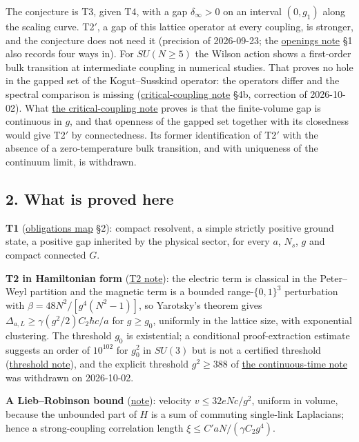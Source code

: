 \documentclass[11pt,a4paper]{article}
\begin{document}
The conjecture is T3, given T4, with a gap \(\delta_\infty>0\) on an
interval \((0,g_1)\) along the scaling curve. T2\('\), a gap of this
lattice operator at every coupling, is stronger, and the conjecture does
not need it (precision of 2026-09-23; the
\href{mass-gap-openings.md}{openings note} §1 also records four ways
in). For \(SU(N\ge5)\) the Wilson action shows a first-order bulk
transition at intermediate coupling in numerical studies. That proves no
hole in the gapped set of the Kogut--Susskind operator: the operators
differ and the spectral comparison is missing
(\href{mass-gap-obligations-lattice.md}{critical-coupling note} §4b,
correction of 2026-10-02). What
\href{mass-gap-obligations-lattice.md}{the critical-coupling note}
proves is that the finite-volume gap is continuous in \(g\), and that
openness of the gapped set together with its closedness would give
T2\('\) by connectedness. Its former identification of T2\('\) with the
absence of a zero-temperature bulk transition, and with uniqueness of
the continuum limit, is withdrawn.

\hypertarget{what-is-proved-here}{%
\subsection{2. What is proved here}\label{what-is-proved-here}}

\textbf{T1} (\href{mass-gap-obligations-lattice.md}{obligations map}
§2): compact resolvent, a simple strictly positive ground state, a
positive gap inherited by the physical sector, for every \(a\), \(N_s\),
\(g\) and compact connected \(G\).

\textbf{T2 in Hamiltonian form}
(\href{strong-coupling-uniform-gap.md}{T2 note}): the electric term is
classical in the Peter--Weyl partition and the magnetic term is a
bounded range-\(\{0,1\}^3\) perturbation with
\(\beta=48N^2/[g^4(N^2-1)]\), so Yarotsky's theorem gives
\(\Delta_{a,L}\ge\gamma(g^2/2)C_2\hbar c/a\) for \(g\ge g_0\), uniformly
in the lattice size, with exponential clustering. The threshold \(g_0\)
is existential; a conditional proof-extraction estimate suggests an
order of \(10^{102}\) for \(g_0^2\) in \(SU(3)\) but is not a certified
threshold (\href{kogut-susskind-strong-coupling-explicit.md}{threshold
note}), and the explicit threshold \(g^2\ge388\) of
\href{kogut-susskind-strong-coupling-explicit.md}{the continuous-time
note} was withdrawn on 2026-10-02.

\textbf{A Lieb--Robinson bound}
(\href{lieb-robinson-kogut-susskind.md}{note}): velocity
\(v\le32eNc/g^2\), uniform in volume, because the unbounded part of
\(H\) is a sum of commuting single-link Laplacians; hence a
strong-coupling correlation length \(\xi\le C'aN/(\gamma C_2g^4)\).
\end{document}
